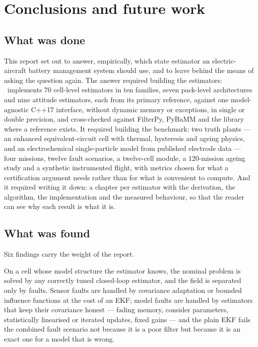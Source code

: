 \chapter{Conclusions and future work}
\label{ch:res-conclusions}

\section{What was done}

This report set out to answer, empirically, which state estimator an electric-aircraft battery
management system should use, and to leave behind the means of asking the question again. The
answer required building the estimators: \estkit\ implements 70 cell-level estimators in ten
families, seven pack-level architectures and nine attitude estimators, each from its primary
reference, against one model-agnostic C++17 interface, without dynamic memory or exceptions,
in single or double precision, and cross-checked against FilterPy, PyBaMM and the 
library where a reference exists. It required building the benchmark: two truth plants ---
an enhanced equivalent-circuit cell with thermal, hysteresis and ageing physics, and an
electrochemical single-particle model from published electrode data --- four missions, twelve
fault scenarios, a twelve-cell module, a 120-mission ageing study and a synthetic instrumented
flight, with metrics chosen for what a certification argument needs rather than for what is
convenient to compute. And it required writing it down: a chapter per estimator with the
derivation, the algorithm, the implementation and the measured behaviour, so that the reader
can see why each result is what it is.

\section{What was found}

Six findings carry the weight of the report.

On a cell whose model structure the estimator knows, the nominal problem is solved by any
correctly tuned closed-loop estimator, and the field is separated only by faults. Sensor faults
are handled by covariance adaptation or bounded influence functions at the cost of an EKF;
model faults are handled by estimators that keep their covariance honest --- fading memory,
consider parameters, statistically linearised or iterated updates, fixed gains --- and the
plain EKF fails the combined fault scenario not because it is a poor filter but because it is
an exact one for a model that is wrong.

